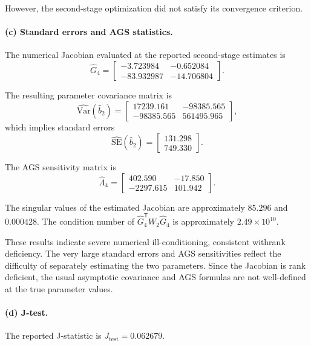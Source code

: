 \documentclass{article}
\begin{document}
However, the second-stage optimization did not satisfy its
convergence criterion.

\paragraph{(c) Standard errors and AGS statistics.}

The numerical Jacobian evaluated at the reported
second-stage estimates is
\[
    \widehat G_4
    =
    \begin{bmatrix}
        -3.723984 & -0.652084\\
        -83.932987 & -14.706804
    \end{bmatrix}.
\]

The resulting parameter covariance matrix is
\[
    \widehat{\mathrm{Var}}(\widehat b_2)
    =
    \begin{bmatrix}
        17239.161 & -98385.565\\
        -98385.565 & 561495.965
    \end{bmatrix},
\]
which implies standard errors
\[
    \widehat{\mathrm{SE}}(\widehat b_2)
    =
    \begin{bmatrix}
        131.298\\
        749.330
    \end{bmatrix}.
\]

The AGS sensitivity matrix is
\[
    \widehat\Lambda_4
    =
    \begin{bmatrix}
        402.590 & -17.850\\
        -2297.615 & 101.942
    \end{bmatrix}.
\]

The singular values of the estimated Jacobian are
approximately $85.296$ and $0.000428$. The condition number
of $\widehat G_4^{\mathsf T}W_2\widehat G_4$ is approximately
$2.49\times10^{10}$.

These results indicate severe numerical ill-conditioning,
consistent withrank deficiency. The very
large standard errors and AGS sensitivities reflect the
difficulty of separately estimating the two parameters.
Since the Jacobian is rank deficient, the usual
asymptotic covariance and AGS formulas are not well-defined
at the true parameter values.

\paragraph{(d) J-test.}

The reported J-statistic is $J_{\mathrm{test}}=0.062679.$
\end{document}
